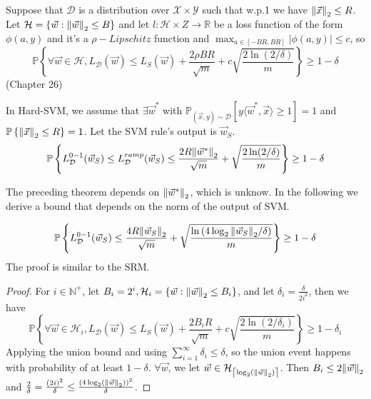 \begin{theorem}
    Suppose that $ \mathcal{D} $ is a distribution over $ \mathcal{X}\times \mathcal{Y} $ such that w.p.1 we have
    $ {\Arrowvert \vec{x}  \Arrowvert}_2 \le R $. Let $ \mathcal{H} = \left\{ \vec{w} : {\Arrowvert \vec{w}  \Arrowvert}_2 \le B \right\} $ and let $ l: \mathcal{H} \times Z \rightarrow \mathbb{R} $ be a loss function of the form $ \phi(a,y) $ and it's a $ \rho-Lipschitz $ function and $ \max_{a \in [-BR, BR]} \left| \phi(a, y) \right| \le c$, so
    \[
    \mathbb{P} \left\{ \forall \vec{w} \in \mathcal{H}, L_{ \mathcal{D} }( \vec{w} )
    \le L_S( \vec{w} ) + \frac{2 \rho BR}{\sqrt{m}} + c \sqrt{ \frac{2 \ln(2/\delta)}{m} }\right\}
    \ge 1 - \delta
    \]
    (Chapter 26)
\end{theorem}

\begin{theorem}
    In Hard-SVM, we assume that $ \exists \vec{w}^* $ with $ \mathbb{P}_{( \vec{x}, y) \sim \mathcal{D}} [ y \langle \vec{w}^*, \vec{x} \rangle \ge 1] = 1 $ and $ \mathbb{P} \left\{ {\Arrowvert \vec{x} \Arrowvert}_2 \le R \right\} = 1 $.
    Let the SVM rule's output is $ \vec{w}_S $.
    \[
        \mathbb{P} \left\{ L^{0-1}_{ \mathcal{D}}( \vec{w} _S ) \le L^{ramp}_{ \mathcal{D}} ( \vec{w} _S) 
        \le \frac{2 R {\Arrowvert \vec{w} ^* \Arrowvert}_2 }{\sqrt{m}} + \sqrt{ \frac{2\ln(2/\delta)}{m} } \right\} \ge 1- \delta
    \]
\end{theorem}

The preceding theorem depends on $ {\Arrowvert \vec{w}^* \Arrowvert}_2  $, which is unknow. In the following we derive a bound that depends on the norm of the output of SVM.\@

\begin{theorem}
    \begin{equation}
        \mathbb{P} \left\{ L^{0-1}_\mathcal{D} ( \vec{w}_S ) \le \frac{4R {\Arrowvert \vec{w} _S \Arrowvert}_2 }{\sqrt m} + \sqrt{\frac{\ln \left( 4\log_2 {\Arrowvert \vec{w} _S \Arrowvert}_2 / \delta  \right)}{m} }  \right\} \ge 1- \delta
    \end{equation}
    The proof is similar to the SRM.\@
    \begin{proof}
        For $ i \in \mathbb{N}^+ $, let $ B_i = 2^i, \mathcal{H}_i = \left\{ \vec{w}: {\Arrowvert \vec{w} \Arrowvert}_2 \le B_i \right\} $, and let $ \delta_i = \frac{\delta}{2i^2} $, then we have
        \[
            \mathbb{P} \left\{ \forall \vec{w} \in \mathcal{H}_i, L_{ \mathcal{D} }( \vec{w} )
            \le L_S( \vec{w} ) + \frac{2 B_i R}{\sqrt{m}} + c \sqrt{ \frac{2 \ln(2/\delta_i )}{m} }\right\}
            \ge 1 - \delta_i
        \]
        Applying the union bound and using $ \sum^{\infty}_{i=1} \delta_i \le \delta $, so the union event happens with probability of at least $ 1- \delta $.
        $ \forall \vec{w} $, we let $ \vec{w} \in \mathcal{H}_{ \left\lceil \log_2 ( {\Arrowvert \vec{w} \Arrowvert}_2 ) \right\rceil} $.
        Then $ B_i \le 2 {\Arrowvert \vec{w} \Arrowvert}_2 $ and $ \frac{2}{\delta} = \frac{{(2i)}^2}{\delta} \le \frac{{(4 \log_2 ( {\Arrowvert \vec{w}  \Arrowvert}_2 ) )}^2}{\delta} $.
    \end{proof}
\end{theorem}

